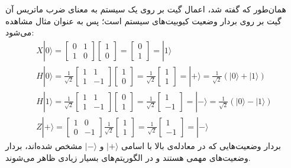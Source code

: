 همان‌طور که گفته شد، اعمال گیت بر روی یک سیستم به معنای ضرب ماتریس آن گیت بر روی بردار وضعیت کیوبیت‌های سیستم است؛ پس به عنوان مثال مشاهده می‌شود:
\begin{equation}
\begin{gathered}
    X|0\rangle = \begin{bmatrix} 0 & 1 \\ 1 & 0 \end{bmatrix} \begin{bmatrix} 1 \\ 0 \end{bmatrix} = \begin{bmatrix} 0 \\ 1 \end{bmatrix} = |1\rangle \\[4pt]
    H|0\rangle = \frac{1}{\sqrt{2}} \begin{bmatrix} 1 & 1 \\ 1 & -1 \end{bmatrix} \begin{bmatrix} 1 \\ 0 \end{bmatrix} = \frac{1}{\sqrt{2}} \begin{bmatrix} 1 \\ 1 \end{bmatrix} = |+\rangle = \frac{1}{\sqrt{2}}(|0\rangle + |1\rangle) \\[4pt]
    H|1\rangle = \frac{1}{\sqrt{2}} \begin{bmatrix} 1 & 1 \\ 1 & -1 \end{bmatrix} \begin{bmatrix} 0 \\ 1 \end{bmatrix} = \frac{1}{\sqrt{2}} \begin{bmatrix} 1 \\ -1 \end{bmatrix} = |-\rangle = \frac{1}{\sqrt{2}}(|0\rangle - |1\rangle) \\[4pt]
    Z|+\rangle = \begin{bmatrix} 1 & 0 \\ 0 & -1 \end{bmatrix} \frac{1}{\sqrt{2}} \begin{bmatrix} 1 \\ 1 \end{bmatrix} = \frac{1}{\sqrt{2}} \begin{bmatrix} 1 \\ -1 \end{bmatrix} = |-\rangle 
\end{gathered}
\end{equation}
بردار وضعیت‌هایی که در معادله‌ی بالا با اسامی
$|+\rangle$
و
$|-\rangle$
مشخص شده‌اند، بردار وضعیت‌های مهمی هستند و در الگوریتم‌های بسیار زیادی ظاهر می‌شوند.

